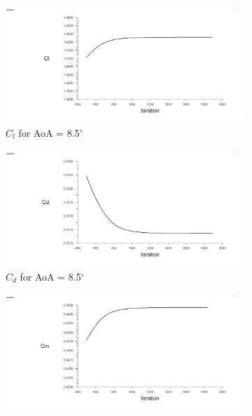 \begin{figure}[H]
  \begin{subfigure}[b]{0.5\textwidth}
    \includegraphics[width=\textwidth]{8.5_deg/AoA_8_5_cl.png}
    \caption{$C_l$ for AoA = 8.5$^\circ$}
    \label{fig:aoa_8.5_cl}
  \end{subfigure}
  \hfill
  \begin{subfigure}[b]{0.5\textwidth}
    \includegraphics[width=\textwidth]{8.5_deg/AoA_8_5_cd.png}
    \caption{$C_d$ for AoA = 8.5$^\circ$}
    \label{fig:aoa_8.5_cd}
  \end{subfigure}
  \begin{subfigure}[b]{0.5\textwidth}
    \includegraphics[width=\textwidth]{8.5_deg/AoA_8_5_cm.png}

\end{subfigure}
\end{figure}
